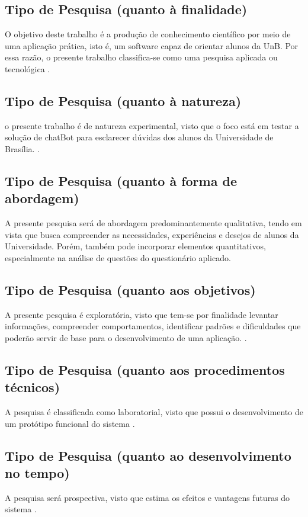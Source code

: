 \subsection{Tipo de Pesquisa (quanto à finalidade)}
O objetivo deste trabalho é a produção de conhecimento científico por meio de uma aplicação prática, isto é, um software capaz de orientar alunos da UnB. Por essa razão, o presente trabalho classifica-se como uma pesquisa aplicada ou tecnológica \cite{fontelles2009}.

\subsection{Tipo de Pesquisa (quanto à natureza)} o presente trabalho é de natureza experimental, visto que o foco está em testar a solução de chatBot para esclarecer dúvidas dos alunos da Universidade de Brasília. \cite{fontelles2009}.

\subsection{Tipo de Pesquisa (quanto à forma de abordagem)}
A presente pesquisa será de abordagem predominantemente qualitativa, tendo em vista que busca compreender as necessidades, experiências e desejos de alunos da Universidade. Porém, também pode incorporar elementos quantitativos, especialmente na análise de questões do questionário aplicado\cite{fontelles2009}.

\subsection{Tipo de Pesquisa (quanto aos objetivos)}
A presente pesquisa é exploratória, visto que tem-se por finalidade levantar informações, compreender comportamentos, identificar padrões e dificuldades que poderão servir de base para o desenvolvimento de uma aplicação. \cite{fontelles2009}.

\subsection{Tipo de Pesquisa (quanto aos procedimentos técnicos)}
A pesquisa é classificada como laboratorial, visto que possui o desenvolvimento de um protótipo funcional do sistema \cite{fontelles2009}.

\subsection{Tipo de Pesquisa (quanto ao desenvolvimento no tempo)}
A pesquisa será prospectiva, visto que estima os efeitos e vantagens futuras do sistema \cite{fontelles2009}.

